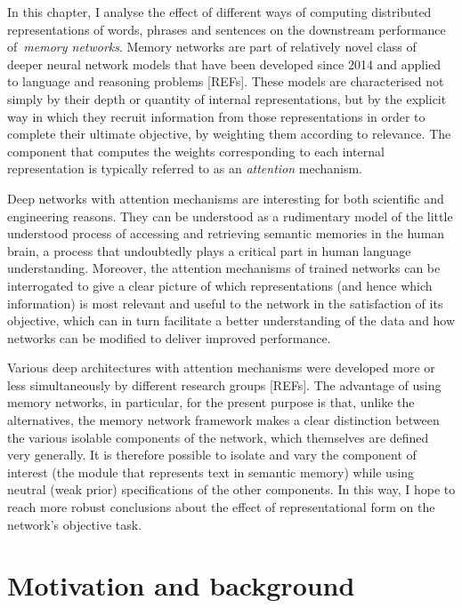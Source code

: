\label{CH6}

In this chapter, I analyse the effect of different ways of computing distributed representations of words, phrases and sentences on the downstream performance of~\emph{memory networks}. Memory networks are part of relatively novel class of deeper neural network models that have been developed since 2014 and applied to language and reasoning problems [REFs]. These models are characterised not simply by their depth or quantity of internal representations, but by the explicit way in which they recruit information from those representations in order to complete their ultimate objective, by weighting them according to relevance. The component that computes the weights corresponding to each internal representation is typically referred to as an \emph{attention} mechanism. 

Deep networks with attention mechanisms are interesting for both scientific and engineering reasons. They can be understood as a rudimentary model of the little understood process of accessing and retrieving semantic memories in the human brain, a process that undoubtedly plays a critical part in human language understanding. Moreover, the attention mechanisms of trained networks can be interrogated to give a clear picture of which representations (and hence which information) is most relevant and useful to the network in the satisfaction of its objective, which can in turn facilitate a better understanding of the data and how networks can be modified to deliver improved performance.  

Various deep architectures with attention mechanisms were developed more or less simultaneously by different research groups [REFs]. The advantage of using memory networks, in particular, for the present purpose is that, unlike the alternatives, the memory network framework makes a clear distinction between the various isolable components of the network, which themselves are defined very generally. It is therefore possible to isolate and vary the component of interest (the module that represents text in semantic memory) while using neutral (weak prior) specifications of the other components. In this way, I hope to reach more robust conclusions about the effect of representational form on the network's objective task.  


\section{Motivation and background}


